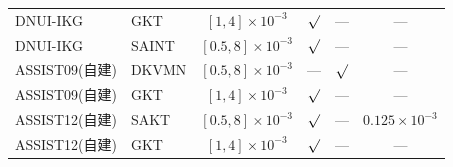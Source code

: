\begin{table}[t]
\begin{tabular}{llcccc}
DNUI-IKG & GKT & $[1,4]\times10^{-3}$ & $\surd$ & — & — \\
DNUI-IKG & SAINT & $[0.5,8]\times10^{-3}$ & $\surd$ & — & — \\
\midrule
ASSIST09(自建) & DKVMN & $[0.5,8]\times10^{-3}$ & — & $\surd$ & — \\
ASSIST09(自建) & GKT & $[1,4]\times10^{-3}$ & $\surd$ & — & — \\
\midrule
ASSIST12(自建) & SAKT & $[0.5,8]\times10^{-3}$ & $\surd$ & — & $0.125\times10^{-3}$ \\
ASSIST12(自建) & GKT & $[1,4]\times10^{-3}$ & $\surd$ & — & — \\
\bottomrule
\end{tabular}
\end{table}
